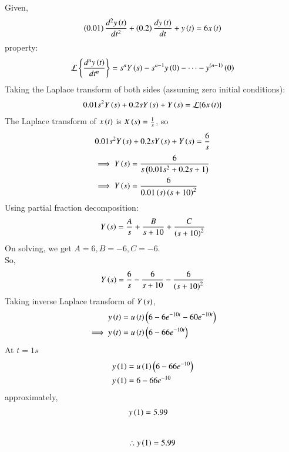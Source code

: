 \documentclass[journal,12pt,twocolumn]{IEEEtran}
\theoremstyle{remark}
\begin{document}
\solution
    Given,
    \begin{align}
         \left(0.01\right) \frac{d^2y\left(t\right)}{dt^2} + \left(0.2\right)\frac{dy\left(t\right) }{dt} + y\left(t\right) = 6x\left(t\right)
    \end{align}
    property:
    \begin{align}
        \mathcal{L}\left\{\frac{d^n y\left(t\right)}{dt^n}\right\} = s^n Y\left(s\right) - s^{n-1} y\left(0\right) - \dots - y^{\left(n-1\right)}\left(0\right)
    \end{align}
    Taking the Laplace transform of both sides (assuming zero initial conditions):
    \begin{align}
        0.01s^2Y\left(s\right) + 0.2sY\left(s\right) + Y\left(s\right) = \mathcal{L}\{6x\left(t\right)\}
    \end{align}
    The Laplace transform of $x\left(t\right)$ is $X\left(s\right) = \frac{1}{s}$, so 
    \begin{align}
        0.01s^2Y\left(s\right) + 0.2sY\left(s\right) + Y\left(s\right) = \frac{6}{s}
    \end{align}
    \begin{align}
        \implies Y\left(s\right) &= \frac{6}{s\left(0.01s^2 + 0.2s + 1\right)}\\
        \implies Y\left(s\right) &= \frac{6}{ 0.01\left(s\right) \left(s + 10\right)^2}
    \end{align}
    Using partial fraction decomposition:
    \begin{align}
    Y\left(s\right) = \frac{A}{s} + \frac{B}{s + 10} + \frac{C}{\left(s + 10\right)^2}
    \end{align}
    On solving, we get $A=6,B=-6,C=-6$.\\
    So,\begin{align}
        Y\left(s\right) = \frac{6}{s} - \frac{6}{s + 10} - \frac{6}{\left(s + 10\right)^2}
    \end{align}
    Taking inverse Laplace transform of $Y\left(s\right)$,
    \begin{align}
        y\left(t\right) &= u\left(t\right) \left(6-6e^{-10t}-60e^{-10t}\right)\\
        \implies y \left(t\right) &=u \left(t\right) \left(6-66e^{-10t}\right)
    \end{align}
    At $t=1s$ 
    \begin{align}
        y\left(1\right) &=u\left(1\right) \left(6-66e^{-10}\right)\\
        y\left(1\right) &=6-66e^{-10}\\
    \end{align}
    approximately,
    \begin{align}
        y\left(1\right) &=5.99
    \end{align}
    \\
    $$\therefore  y\left(1\right)=5.99$$
\end{document}
